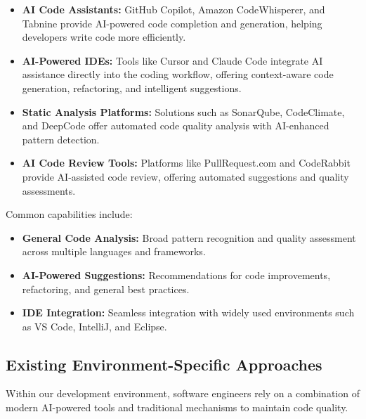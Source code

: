 \begin{spacing}{1.2}
\begin{itemize}
\item \textbf{AI Code Assistants:} GitHub Copilot, Amazon CodeWhisperer, and Tabnine provide AI-powered code completion and generation, helping developers write code more efficiently.
\item \textbf{AI-Powered IDEs:} Tools like Cursor and Claude Code integrate AI assistance directly into the coding workflow, offering context-aware code generation, refactoring, and intelligent suggestions.
\item \textbf{Static Analysis Platforms:} Solutions such as SonarQube, CodeClimate, and DeepCode offer automated code quality analysis with AI-enhanced pattern detection.
\item \textbf{AI Code Review Tools:} Platforms like PullRequest.com and CodeRabbit provide AI-assisted code review, offering automated suggestions and quality assessments.
\end{itemize}

Common capabilities include:

\begin{itemize}
\item \textbf{General Code Analysis:} Broad pattern recognition and quality assessment across multiple languages and frameworks.
\item \textbf{AI-Powered Suggestions:} Recommendations for code improvements, refactoring, and general best practices.
\item \textbf{IDE Integration:} Seamless integration with widely used environments such as VS Code, IntelliJ, and Eclipse.
\end{itemize}

\subsection{Existing Environment-Specific Approaches}

Within our development environment, software engineers rely on a combination of modern AI-powered tools and traditional mechanisms to maintain code quality.



\end{spacing}
